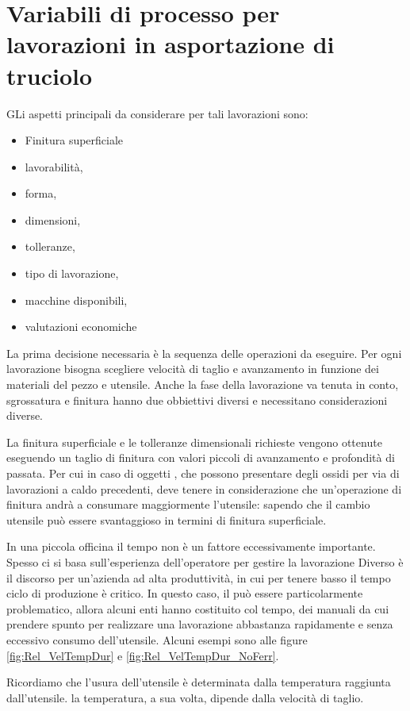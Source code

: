 \chapter{Variabili di processo per lavorazioni in asportazione di truciolo}
\label{chp:VarProcAsportazione}
GLi aspetti principali da considerare per tali lavorazioni sono:
\begin{itemize}
\item Finitura superficiale
\item lavorabilità,
\item forma, 
\item dimensioni, 
\item tolleranze,
\item tipo di lavorazione, 
\item macchine disponibili, 
\item valutazioni economiche
\end{itemize}

La prima decisione necessaria è la sequenza delle operazioni da eseguire.
Per ogni lavorazione bisogna scegliere velocità di taglio e avanzamento in funzione dei materiali del pezzo e utensile. Anche la fase della lavorazione 
va tenuta in conto, sgrossatura e finitura hanno due obbiettivi diversi 
e necessitano considerazioni diverse.

La finitura superficiale e le tolleranze dimensionali richieste vengono ottenute eseguendo un taglio di finitura con valori piccoli di avanzamento e profondità di passata.
Per cui in caso di oggetti , che possono presentare degli ossidi per via di lavorazioni a caldo precedenti, deve tenere in considerazione che un'operazione di finitura andrà a consumare maggiormente l'utensile: sapendo che il cambio utensile può essere svantaggioso in termini di finitura superficiale.

In una piccola officina il tempo non è un fattore eccessivamente importante.
Spesso ci si basa sull'esperienza dell'operatore per gestire la lavorazione
Diverso è il discorso per un'azienda ad alta produttività, in cui per tenere
basso il tempo ciclo di produzione è critico.
In questo caso, il  può essere particolarmente problematico, 
allora alcuni enti hanno costituito col tempo, dei manuali da cui prendere
spunto per realizzare una lavorazione abbastanza rapidamente e senza eccessivo consumo dell'utensile. Alcuni esempi sono alle figure \ref{fig:Rel_VelTempDur} e \ref{fig:Rel_VelTempDur_NoFerr}. 

Ricordiamo che l'usura dell'utensile è determinata dalla temperatura raggiunta dall'utensile.
la temperatura, a sua volta, dipende dalla velocità di taglio.

